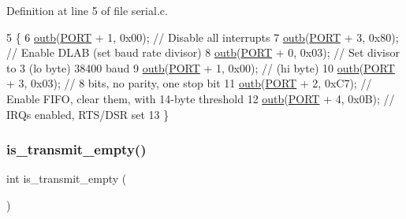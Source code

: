 Definition at line 5 of file serial.\+c.


\begin{DoxyCode}
5                    \{
6    \hyperlink{a00164_aa37f5841c54156a4b14fc0d6f626b44f_aa37f5841c54156a4b14fc0d6f626b44f}{outb}(\hyperlink{a00056_a614217d263be1fb1a5f76e2ff7be19a2_a614217d263be1fb1a5f76e2ff7be19a2}{PORT} + 1, 0x00);    \textcolor{comment}{// Disable all interrupts}
7    \hyperlink{a00164_aa37f5841c54156a4b14fc0d6f626b44f_aa37f5841c54156a4b14fc0d6f626b44f}{outb}(\hyperlink{a00056_a614217d263be1fb1a5f76e2ff7be19a2_a614217d263be1fb1a5f76e2ff7be19a2}{PORT} + 3, 0x80);    \textcolor{comment}{// Enable DLAB (set baud rate divisor)}
8    \hyperlink{a00164_aa37f5841c54156a4b14fc0d6f626b44f_aa37f5841c54156a4b14fc0d6f626b44f}{outb}(\hyperlink{a00056_a614217d263be1fb1a5f76e2ff7be19a2_a614217d263be1fb1a5f76e2ff7be19a2}{PORT} + 0, 0x03);    \textcolor{comment}{// Set divisor to 3 (lo byte) 38400 baud}
9    \hyperlink{a00164_aa37f5841c54156a4b14fc0d6f626b44f_aa37f5841c54156a4b14fc0d6f626b44f}{outb}(\hyperlink{a00056_a614217d263be1fb1a5f76e2ff7be19a2_a614217d263be1fb1a5f76e2ff7be19a2}{PORT} + 1, 0x00);    \textcolor{comment}{//                  (hi byte)}
10    \hyperlink{a00164_aa37f5841c54156a4b14fc0d6f626b44f_aa37f5841c54156a4b14fc0d6f626b44f}{outb}(\hyperlink{a00056_a614217d263be1fb1a5f76e2ff7be19a2_a614217d263be1fb1a5f76e2ff7be19a2}{PORT} + 3, 0x03);    \textcolor{comment}{// 8 bits, no parity, one stop bit}
11    \hyperlink{a00164_aa37f5841c54156a4b14fc0d6f626b44f_aa37f5841c54156a4b14fc0d6f626b44f}{outb}(\hyperlink{a00056_a614217d263be1fb1a5f76e2ff7be19a2_a614217d263be1fb1a5f76e2ff7be19a2}{PORT} + 2, 0xC7);    \textcolor{comment}{// Enable FIFO, clear them, with 14-byte threshold}
12    \hyperlink{a00164_aa37f5841c54156a4b14fc0d6f626b44f_aa37f5841c54156a4b14fc0d6f626b44f}{outb}(\hyperlink{a00056_a614217d263be1fb1a5f76e2ff7be19a2_a614217d263be1fb1a5f76e2ff7be19a2}{PORT} + 4, 0x0B);    \textcolor{comment}{// IRQs enabled, RTS/DSR set}
13 \}
\end{DoxyCode}
\mbox{\label{a00059_a01fe5504f7b8f4eee1545737495bae76_a01fe5504f7b8f4eee1545737495bae76}} 
\subsubsection{\texorpdfstring{is\+\_\+transmit\+\_\+empty()}{is\_transmit\_empty()}}
{\footnotesize\ttfamily int is\+\_\+transmit\+\_\+empty (\begin{DoxyParamCaption}{ }\end{DoxyParamCaption})}




